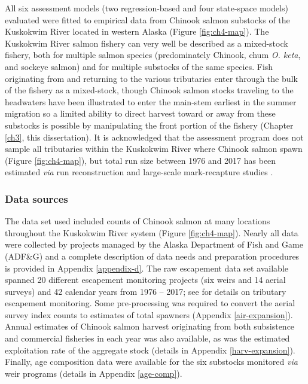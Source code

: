 \documentclass[12pt,]{book}
\theoremstyle{definition}
\theoremstyle{definition}
\theoremstyle{definition}
\theoremstyle{remark}
\begin{document}
\noindent
All six assessment models (two regression-based and four state-space
models) evaluated were fitted to empirical data from Chinook salmon
substocks of the Kuskokwim River located in western Alaska (Figure
\ref{fig:ch4-map}). The Kuskokwim River salmon fishery can very well be
described as a mixed-stock fishery, both for multiple salmon species
(predominately Chinook, chum \emph{O. keta}, and sockeye salmon) and for
multiple substocks of the same species. Fish originating from and
returning to the various tributaries enter through the bulk of the
fishery as a mixed-stock, though Chinook salmon stocks traveling to the
headwaters have been illustrated to enter the main-stem earliest in the
summer migration \citep{smith-liller-2017a, smith-liller-2017b} so a
limited ability to direct harvest toward or away from these substocks is
possible by manipulating the front portion of the fishery (Chapter
\ref{ch3}, this dissertation). It is acknowledged that the assessment
program does not sample all tributaries within the Kuskokwim River where
Chinook salmon spawn (Figure \ref{fig:ch4-map}), but total run size
between 1976 and 2017 has been estimated \emph{via} run reconstruction
\citep{liller-etal-2018} and large-scale mark-recapture studies
\citep{schaberg-etal-2012, smith-liller-2017a, smith-liller-2017b, stuby-2007}.

\subsubsection{Data sources}\label{data-sources}

\noindent
The data set used included counts of Chinook salmon at many locations
throughout the Kuskokwim River system (Figure \ref{fig:ch4-map}). Nearly
all data were collected by projects managed by the Alaska Department of
Fish and Game (ADF\&G) and a complete description of data needs and
preparation procedures is provided in Appendix \ref{appendix-d}. The raw
escapement data set available spanned 20 different escapement monitoring
projects (six weirs and 14 aerial surveys) and 42 calendar years from
1976 -- 2017; see \citet{head-smith-2018} for details on tributary
escapement monitoring. Some pre-processing was required to convert the
aerial survey index counts to estimates of total spawners (Appendix
\ref{air-expansion}). Annual estimates of Chinook salmon harvest
originating from both subsistence and commercial fisheries in each year
was also available, as was the estimated exploitation rate of the
aggregate stock (details in Appendix \ref{harv-expansion}). Finally, age
composition data were available for the six substocks monitored
\emph{via} weir programs (details in Appendix \ref{age-comp}).
\end{document}
